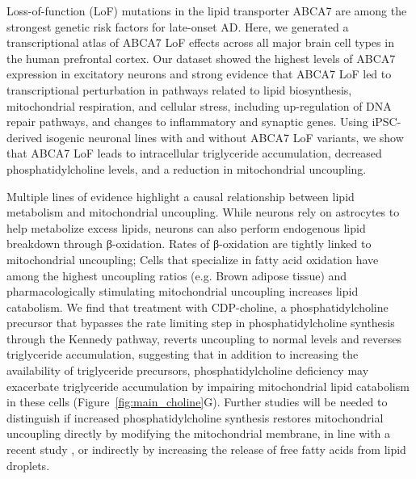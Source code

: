 
Loss-of-function (LoF) mutations in the lipid transporter ABCA7 are among the strongest genetic risk factors for late-onset AD. Here, we generated a transcriptional atlas of ABCA7 LoF effects across all major brain cell types in the human prefrontal cortex. Our dataset showed the highest levels of ABCA7 expression in excitatory neurons and strong evidence that ABCA7 LoF led to transcriptional perturbation in pathways related to lipid biosynthesis, mitochondrial respiration, and cellular stress, including up-regulation of DNA repair pathways, and changes to inflammatory and synaptic genes. Using iPSC-derived isogenic neuronal lines with and without ABCA7 LoF variants, we show that ABCA7 LoF leads to intracellular triglyceride accumulation, decreased phosphatidylcholine levels, and a reduction in mitochondrial uncoupling.

Multiple lines of evidence highlight a causal relationship between lipid metabolism and  mitochondrial uncoupling\cite{Prola2021-uz,Tseng2010-ly,Rossmeisl2005-yi,Goedeke2021-gt,Amorim2022-zf}. While neurons rely on astrocytes to help metabolize excess  lipids\cite{Ralhan2021-kq,Islimye2022-av}\cite{Ioannou2019-hl,Moulton2021-ft}, neurons can also perform endogenous lipid breakdown through β-oxidation\cite{McFadden2014-ri,noauthor_2004-nu}. Rates of β-oxidation are tightly linked to mitochondrial uncoupling; Cells that specialize in fatty acid oxidation have among the highest uncoupling ratios (e.g. Brown adipose tissue)\cite{Jastroch2017-ve,Giralt_undated-jw,Fedorenko2012-oq} and pharmacologically stimulating mitochondrial uncoupling increases lipid catabolism\cite{Prola2021-uz,Tseng2010-ly,Rossmeisl2005-yi,Goedeke2021-gt}. We find that treatment with CDP-choline, a phosphatidylcholine precursor that bypasses the rate limiting step in phosphatidylcholine synthesis through the Kennedy pathway\cite{noauthor_1997-th}, reverts uncoupling to normal levels and reverses triglyceride accumulation,  suggesting that in addition to increasing the availability of triglyceride precursors, phosphatidylcholine deficiency may exacerbate triglyceride accumulation by impairing mitochondrial lipid catabolism in these cells (Figure~\ref{fig:main_choline}G). Further studies will be needed to distinguish if increased phosphatidylcholine synthesis restores mitochondrial uncoupling directly by modifying the mitochondrial membrane, in line with a recent study \cite{Prola2021-uz}, or indirectly by increasing the release of free fatty acids from lipid droplets\cite{Krahmer2011-xy,Guo2008-xt,Fei2011-bl,Schott2019-zq}.

